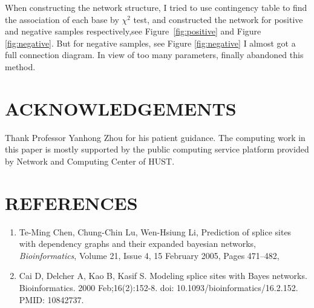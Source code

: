 \documentclass{gapd}
\begin{document}
When constructing the network structure, I tried to use contingency
table to find the association of each base by \(\chi^2\) test, and
constructed the network for positive and negative samples respectively,see Figure~\ref*{fig:positive} and Figure \ref*{fig:negative}.
But for negative samples, see Figure \ref*{fig:negative} I almost got a full connection diagram. In
view of too many parameters, finally abandoned this method.

\section{ACKNOWLEDGEMENTS}\label{acknowledgements}

Thank Professor Yanhong Zhou for his patient guidance. The computing
work in this paper is mostly supported by the public computing service
platform provided by Network and Computing Center of HUST.

\section{REFERENCES}\label{references}

\begin{enumerate}
  \item
    Te-Ming Chen, Chung-Chin Lu, Wen-Hsiung Li, Prediction of splice sites
    with dependency graphs and their expanded bayesian networks,
    \emph{Bioinformatics}, Volume 21, Issue 4, 15 February 2005, Pages
    471--482, 
  \item
    Cai D, Delcher A, Kao B, Kasif S. Modeling splice sites with Bayes
    networks. Bioinformatics. 2000 Feb;16(2):152-8. doi:
    10.1093/bioinformatics/16.2.152. PMID: 10842737.
\end{enumerate}
\end{document}
